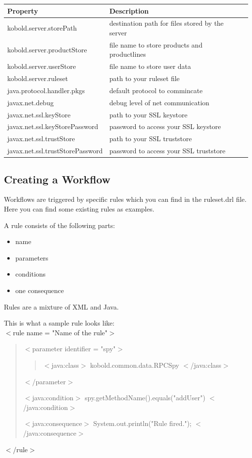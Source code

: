 \begin{tabular}{|l|l|l|}\hline
\textbf{Property} &  \textbf{Description}\\ \hline
kobold.server.storePath  & destination path for files stored by the server \\ \hline
kobold.server.productStore & file name to store products and
productlines \\ \hline
kobold.server.userStore & file name to store user data \\ \hline
kobold.server.ruleset & path to your ruleset file \\ \hline
java.protocol.handler.pkgs & default protocol to commincate \\ \hline
javax.net.debug & debug level of net communication \\ \hline
javax.net.ssl.keyStore & path to your SSL keystore \\ \hline
javax.net.ssl.keyStorePassword & password to access your SSL keystore \\
    \hline
javax.net.ssl.trustStore & path to your SSL truststore \\ \hline
javax.net.ssl.trustStorePassword & password to access your SSL
truststore \\ \hline
\end{tabular}



\subsection{Creating a Workflow}

Workflows are triggered by specific rules which you can find in the ruleset.drl file.
Here you can find some existing rules as examples. \par

A rule consists of the following parts:
\begin{itemize}
	\item name
	\item parameters
	\item conditions
	\item one consequence
\end{itemize}
Rules are a mixture of XML and Java.\par

This is what a sample rule looks like: \\

$<$rule name = "Name of the rule"$>$\\
\begin{quote}
$<$parameter identifier = "spy"$>$\\
\begin{quote}
$<$java:class$>$ kobold.common.data.RPCSpy $<$/java:class$>$\\
\end{quote}
$<$/parameter$>$\par
$<$java:condition$>$ spy.getMethodName().equals("addUser") $<$/java:condition$>$\par
$<$java:consequence$>$ System.out.println("Rule fired."); $<$/java:consequence$>$\\
\end{quote}
$<$/rule$>$\par


